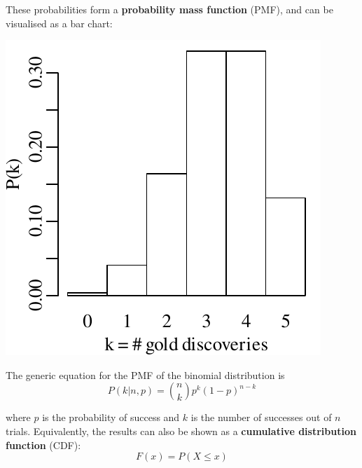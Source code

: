 These probabilities form a \textbf{probability mass function} (PMF),
and can be visualised as a bar chart:

\noindent\begin{minipage}[t][][b]{.3\textwidth}
\includegraphics[width=\textwidth]{../figures/goldbarplot.pdf}
\medskip
\end{minipage}
\begin{minipage}[t][][t]{.7\textwidth}
  \label{fig:goldbar}
\end{minipage}

The generic equation for the PMF of the binomial distribution is
\begin{equation}
  P(k|n,p) = \binom{n}{k} p^k (1-p)^{n-k}
  \label{eq:binom}
\end{equation}

\noindent where $p$ is the probability of success and $k$ is the
number of successes out of $n$ trials. Equivalently, the results can
also be shown as a \textbf{cumulative distribution function} (CDF):
\begin{equation}
  F(x) = P(X \leq x)
  \label{eq:CDF}
\end{equation}

